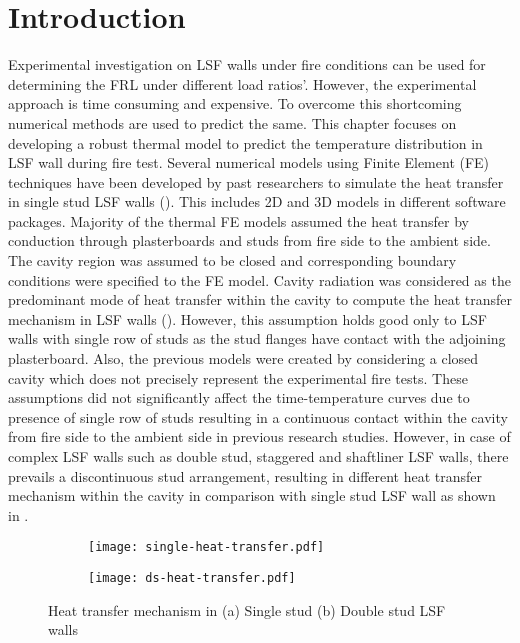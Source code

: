 \section{Introduction}

Experimental investigation on LSF walls under fire conditions can be used for determining the FRL under different load ratios'. However, the experimental approach is time consuming and expensive. To overcome this shortcoming numerical methods are used to predict the same. This chapter focuses on developing a robust thermal model to predict the temperature distribution in LSF wall during fire test. Several numerical models using Finite Element (FE) techniques have been developed by past researchers to simulate the heat transfer in single stud LSF walls (\cite{Feng2003,Keerthan2012,Ariyanayagam2019}). This includes 2D and 3D models in different software packages. Majority of the thermal FE models assumed the heat transfer by conduction through plasterboards and studs from fire side to the ambient side. The cavity region was assumed to be closed and corresponding boundary conditions were specified to the FE model. Cavity radiation was considered as the predominant mode of heat transfer within the cavity to compute the heat transfer mechanism in LSF walls (\cite{Rusthi2017,Ariyanayagam2019}). However, this assumption holds good only to LSF walls with single row of studs as the stud flanges have contact with the adjoining plasterboard. Also, the previous models were created by considering a closed cavity which does not precisely represent the experimental fire tests. These assumptions did not significantly affect the time-temperature curves due to presence of single row of studs resulting in a continuous contact within the cavity from fire side to the ambient side in previous research studies. However, in case of complex LSF walls such as double stud, staggered and shaftliner LSF walls, there prevails a discontinuous stud arrangement, resulting in different heat transfer mechanism within the cavity in comparison with single stud LSF wall as shown in .  
\begin{figure}[!htbp]
	\centering
	\begin{subfigure}[b]{0.5\textwidth}
		\centering
		\texttt{[image: single-heat-transfer.pdf]}
		\caption{}
		\label{subfig:single-heat-transfer}
	\end{subfigure}
	\begin{subfigure}[b]{0.5\textwidth}
		\centering
		\texttt{[image: ds-heat-transfer.pdf]}
		\caption{}
		\label{subfig:ds-heat-transfer}
	\end{subfigure}
	   \caption{Heat transfer mechanism in (a) Single stud (b) Double stud LSF walls}
	   \label{fig:heat-transfer}
\end{figure} 


